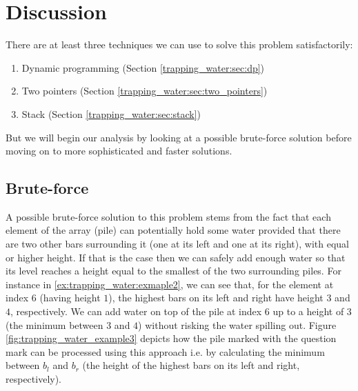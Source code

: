 %
%	

\section{Discussion}
\label{trapping_water:sec:discussion}
There are at least three techniques we can use to solve this problem satisfactorily:
\begin{enumerate}
	\item Dynamic programming (Section \ref{trapping_water:sec:dp})
	\item Two pointers (Section \ref{trapping_water:sec:two_pointers})
	\item Stack (Section \ref{trapping_water:sec:stack})
\end{enumerate}
But we will begin our analysis  by looking at a possible brute-force solution before moving  on to more sophisticated and faster solutions.

\subsection{Brute-force}
\label{trapping_water:sec:bruteforce}

A possible brute-force solution to this problem stems from the fact that each element of the array (pile) can potentially hold some water provided that there are two other bars surrounding it (one at its left and one at its right), with equal or higher height.
If that is the case then we can safely add enough water so that its level reaches a height equal to the smallest of the two surrounding piles.
For instance in  \ref{ex:trapping_water:exmaple2}, we can see that,  for the element at index $6$ (having height $1$), the highest bars on its left and right have height $3$ and $4$, respectively. 
We can add water on top of the pile at index $6$ up to a height of $3$ (the minimum between $3$ and $4$) without risking the water spilling out.
Figure \ref{fig:trapping_water_example3} depicts how the pile marked with the question mark can be processed using this approach i.e. by calculating the minimum between $b_l$ and $b_r$ (the height of the highest bars on its left and right, respectively).

